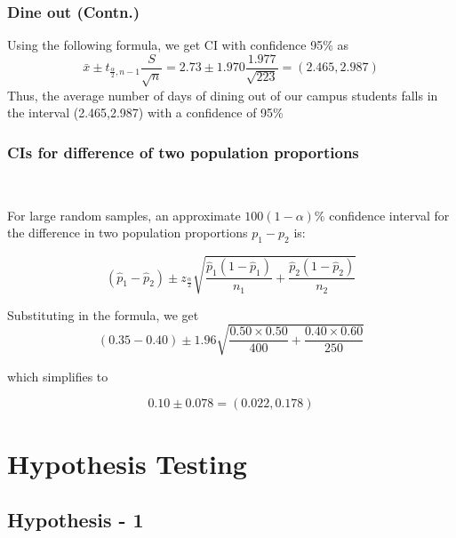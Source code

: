 \documentclass{beamer}
\begin{document}
\begin{frame}
\frametitle{Dine out (Contn.)}
    
    Using the following formula, we get CI with confidence 95\% as
        \begin{equation}
        \bar{x} \pm t_{\frac{\alpha}{2}, n-1} \frac{S}{\sqrt{n}} =
        2.73 \pm 1.970 \frac{1.977}{\sqrt{223}} = (2.465,2.987)
        \end{equation}
    Thus, the average number of days of dining out of our campus students falls in the interval (2.465,2.987) with a confidence of 95\%  
\end{frame}




\begin{frame}
    \frametitle{CIs for difference of two population proportions}\
    \begin{block}{}
    For large random samples, an approximate $100(1 - \alpha)\%$ confidence interval for the difference in two population proportions $p_1 - p_2$ is:

    \[
    (\hat{p}_1 - \hat{p}_2) \pm z_{\frac{\alpha}{2}} \sqrt{\frac{\hat{p}_1(1 - \hat{p}_1)}{n_1} + \frac{\hat{p}_2(1 - \hat{p}_2)}{n_2}}
    \]
    \end{block}

    Substituting in the formula, we get
    \begin{equation}
    (0.35 - 0.40) \pm 1.96 \sqrt{\frac{0.50 \times 0.50}{400} + \frac{0.40 \times 0.60}{250}}
    \end{equation}
    
    which simplifies to
    
    \begin{equation}
    0.10 \pm 0.078 = (0.022, 0.178)
    \end{equation}
  
\end{frame}


\section{Hypothesis Testing }

\subsection{Hypothesis - 1}
\end{document}
